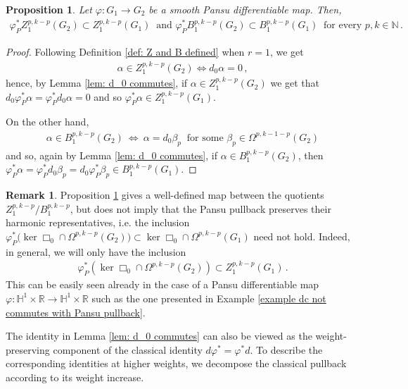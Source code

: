 \documentclass[dvipsnames]{amsart}
\newtheorem{proposition}[theorem]{Proposition}
\theoremstyle{definition}
\newtheorem{remark}[theorem]{Remark}
\theoremstyle{definition}
\numberwithin{equation}{section}
\newcommand{\R}{\mathbb{R}}
\begin{document}
\begin{proposition}\label{prop: commutativity at page 1}
    Let $\varphi\colon G_1\to G_2$ be a smooth Pansu differentiable map. Then,
    \begin{align*}
        \varphi_P^\ast Z_1^{p,k-p}(G_2)\subset Z_1^{p,k-p}(G_1)\ \text{ and }\varphi_P^\ast B_1^{p,k-p}(G_2)\subset B_1^{p,k-p}(G_1)\ \text{ for every }p,k\in\mathbb{N}\,.
    \end{align*}
\end{proposition}
\begin{proof}
    Following Definition \ref{def: Z and B defined} when $r=1$, we get
    \begin{align*}
        \alpha\in Z_1^{p,k-p}(G_2)\Longleftrightarrow d_0\alpha=0\,,
    \end{align*}
    hence, by Lemma \ref{lem: d_0 commutes}, if $\alpha\in Z_1^{p,k-p}(G_2)$ we get that $d_0\varphi_P^\ast\alpha=\varphi_P^\ast d_0\alpha=0$ and so $\varphi_P^\ast\alpha\in Z_1^{p,k-p}(G_1)$.

    On the other hand, 
    \begin{align*}
        \alpha\in B_1^{p,k-p}(G_2)\ \Longleftrightarrow\ \alpha=d_0\beta_p\ \text{ for some }\beta_p\in\Omega^{p,k-1-p}(G_2)
    \end{align*}
    and so, again by Lemma \ref{lem: d_0 commutes}, if $\alpha\in B_1^{p,k-p}(G_2)$, then $\varphi_P^\ast\alpha=\varphi_P^\ast d_0\beta_p=d_0\varphi^\ast_P\beta_p\in B_1^{p,k-p}(G_1)$.
\end{proof}
\begin{remark}
    Proposition \ref{prop: commutativity at page 1} gives a well-defined map between the quotients $Z_1^{p,k-p}/B_1^{p,k-p}$, but does not imply that the Pansu pullback preserves their harmonic representatives, i.e. the inclusion $\varphi_P^\ast\big(\ker \Box_0\cap\Omega^{p,k-p}(G_2)\big)\subset \ker\Box_0\cap\Omega^{p,k-p}(G_1)$ need not hold. Indeed, in general, we will only have the inclusion
    \begin{align*}
        \varphi_P^\ast\left(\ker\Box_0\cap\Omega^{p,k-p}(G_2)\right)\subset Z_1^{p,k-p}(G_1)\,.
    \end{align*}
    This can be easily seen already in the case of a Pansu differentiable map $\varphi\colon\mathbb H^1\times\R\to\mathbb H^1\times\R$ such as the one presented in Example \ref{example dc not commutes with Pansu pullback}.

The identity in Lemma \ref{lem: d_0 commutes} can also be viewed as the weight-preserving component of the classical identity $d\varphi^*=\varphi^*d$. To describe the corresponding identities at higher weights, we decompose the classical pullback according to its weight increase.
\end{remark}
\end{document}
